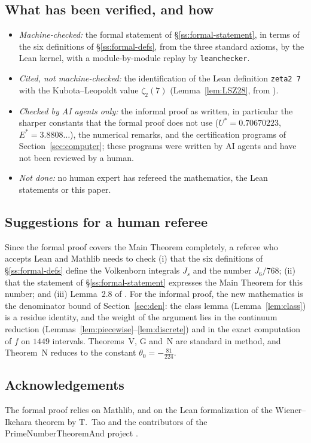 \documentclass{amsart}
\theoremstyle{definition}
\theoremstyle{remark}
\numberwithin{equation}{section}
\begin{document}
\subsection{What has been verified, and how}\label{ss:ai-what}

\begin{itemize}
\item \emph{Machine-checked:} the formal statement of
  \S\ref{ss:formal-statement}, in terms of the six definitions of
  \S\ref{ss:formal-defs}, from the three standard axioms, by the Lean kernel,
  with a module-by-module replay by \texttt{leanchecker}.
\item \emph{Cited, not machine-checked:} the identification of the Lean
  definition \texttt{zeta2~7} with the Kubota--Leopoldt value $\zeta_2(7)$
  (Lemma~\ref{lem:LSZ28}, from \cite{LSZ26}).
\item \emph{Checked by AI agents only:} the informal proof as written, in
  particular the sharper constants that the formal proof does not use
  ($U^*=0.70670223$, $E^*=3.8808\ldots$), the numerical remarks, and the
  certification programs of Section~\ref{sec:computer}; these programs were
  written by AI agents and have not been reviewed by a human.
\item \emph{Not done:} no human expert has refereed the mathematics, the Lean
  statements or this paper.
\end{itemize}

\subsection{Suggestions for a human referee}\label{ss:ai-referee}

Since the formal proof covers the Main Theorem completely, a referee who
accepts Lean and Mathlib needs to check (i) that the six definitions of
\S\ref{ss:formal-defs} define the Volkenborn integrals $J_s$ and the number
$J_6/768$; (ii) that the statement of \S\ref{ss:formal-statement} expresses
the Main Theorem for this number; and (iii) Lemma~2.8 of \cite{LSZ26}. For the
informal proof, the new mathematics is the denominator bound of
Section~\ref{sec:den}: the class lemma (Lemma~\ref{lem:class}) is a residue
identity, and the weight of the argument lies in the continuum reduction
(Lemmas~\ref{lem:piecewise}--\ref{lem:discrete}) and in the exact computation
of $f$ on $1449$ intervals. Theorems~V, G and~N are standard in method, and
Theorem~N reduces to the constant $\theta_0=-\frac{81}{224}$.

\subsection*{Acknowledgements}
The formal proof relies on Mathlib, and on the Lean formalization of the
Wiener--Ikehara theorem by T.~Tao and the contributors of the
PrimeNumberTheoremAnd project \cite{PNTLean}.
\end{document}
